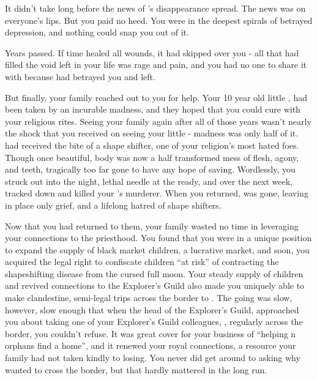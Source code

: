 \documentclass[char]{NeptuneBall}
\begin{document}
It didn't take long before the news of \cAriel{}'s disappearance spread. The news was on everyone's lips. But you paid no heed. You were in the deepest spirals of betrayed depression, and nothing could snap you out of it.

Years passed. If time healed all wounds, it had skipped over you - all that had filled the void left in your life was rage and pain, and you had no one to share it with because \emph{\cAriel{\they}} had betrayed you and left.

But finally, your family reached out to you for help. Your 10 year old little \cSister{\sibling}, \cSister{} had been taken by an incurable madness, and they hoped that you could cure \cSister{\them} with your religious rites. Seeing your family again after all of those years wasn't nearly the shock that you received on seeing your little \cSister{\sibling} - madness was only half of it. \cSister{\They} had received the bite of a shape shifter, one of your religion's most hated foes. Though \cSister{\they} \cSister{\were} once beautiful, \cSister{\their} body was now a half transformed mess of flesh, agony, and teeth, tragically too far gone to have any hope of saving. Wordlessly, you struck out into the night, lethal needle at the ready, and over the next week, tracked down and killed your \cSister{\sibling}'s murderer. When you returned, \cSister{} was gone, leaving in \cSister{\their} place only grief, and a lifelong hatred of shape shifters.

Now that you had returned to them, your family wasted no time in leveraging your connections to the priesthood. You found that you were in a unique position to expand the supply of black market children, a lucrative market, and soon, you acquired the legal right to confiscate children ``at risk'' of contracting the shapeshifting disease from the cursed full moon. Your steady supply of children and revived connections to the Explorer's Guild also made you uniquely able to make clandestine, semi-legal trips across the border to \pPacifica{}. The going was slow, however, slow enough that when the head of the Explorer's Guild, \cPlant{\Prince} \cPlant{} \cPlant{\themself} approached you about taking one of your Explorer's Guild colleagues, \cPlant{\their} \cPrincess{\nephew}, \cPrincess{\Prince} \cPrincess{} regularly across the border, you couldn't refuse. It was great cover for your business of ``helping \pAtlantis{}n orphans find a home'', and it renewed your royal connections, a resource your family had not taken kindly to losing. You never did get around to asking why \cPrincess{\they} wanted to cross the border, but that hardly mattered in the long run.
\end{document}
